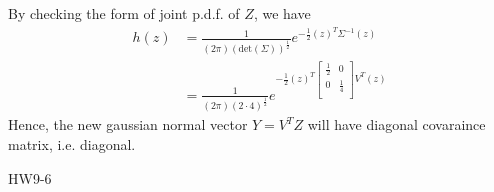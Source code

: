     By checking the form of joint p.d.f. of \(Z\), we have  
 \begin{equation}
    \begin{aligned}
    h(z) &= \frac{1}{(2\pi) (\text{det}(\Sigma) )^{\frac{1}{2}}} e^{-\frac{1}{2} (z)^T \Sigma ^{-1} (z) }
     \\ &= \frac{1}{(2\pi) (2 \cdot 4 )^{\frac{1}{2}}} e^{-\frac{1}{2} (z)^T \begin{bmatrix}
        \frac{1}{2} & 0  \\
        0 & \frac{1}{4}  \\
    \end{bmatrix} V^T (z) }
    \end{aligned}
 \end{equation}
 Hence, the new gaussian normal vector \(Y = V^T Z\) will have diagonal covaraince matrix, i.e. diagonal. 
   
\begin{exercise}
    HW9-6
\end{exercise}
    